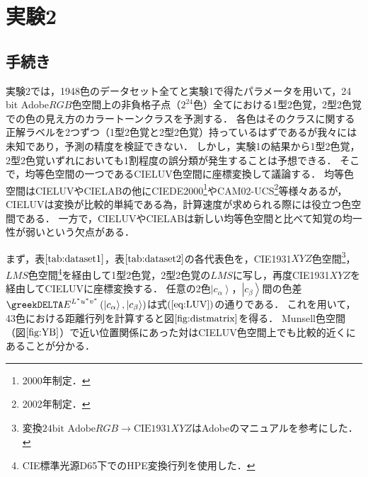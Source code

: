 \documentclass[uplatex,paper=a4,fontsize=4.0truemm,jafontsize=4.0truemm,head_space=30.0truemm,foot_space=30.0truemm,baselineskip=8.0truemm,line_length=40zw,gutter=25.0truemm,oneside,openany,fleqn,hanging_panctuation,open_bracket_pos=nibu_tentsuki,dvipdfmx,jis2004,book,titlepage]{jlreq}
\theoremstyle{mystyle}
\newcommand{\mathdisplaystyle}[1]{\(\displaystyle{#1}\)}
\newcommand{\Reference}[1]{\mathdisplaystyle{\ref{#1}}}
\newcommand{\Equationreference}[1]{\mathdisplaystyle{\parentheses{\ref{#1}}}}
\newcommand{\parentheses}[1]{\left(#1\right)}
\newcommand{\Diracket}[1]{\left\lvert#1\right\rangle}
\begin{document}
		\section{実験2}
			\subsection{手続き}
				実験2では，1948色のデータセット全てと実験1で得たパラメータを用いて，24 bit Adobe\mathdisplaystyle{RGB}色空間上の非負格子点（\mathdisplaystyle{2^{24}}色）全てにおける1型2色覚，2型2色覚での色の見え方のカラートーンクラスを予測する．
				各色はそのクラスに関する正解ラベルを2つずつ（1型2色覚と2型2色覚）持っているはずであるが我々には未知であり，予測の精度を検証できない．
				しかし，実験1の結果から1型2色覚，2型2色覚いずれにおいても1割程度の誤分類が発生することは予想できる．
				そこで，均等色空間の一つであるCIELUV色空間に座標変換して議論する．
				均等色空間はCIELUVやCIELABの他にCIEDE2000\footnote{2000年制定．}やCAM02-UCS\footnote{2002年制定．}等様々ある\cite{Yaguchi2017b}が，CIELUVは変換が比較的単純である為，計算速度が求められる際には役立つ色空間である．
				一方で，CIELUVやCIELABは新しい均等色空間と比べて知覚の均一性が弱いという欠点がある\cite[p.~10]{Robertson1977}．

				まず，表\Reference{tab:dataset1}，表\Reference{tab:dataset2}の各代表色を，CIE1931\mathdisplaystyle{XYZ}色空間\footnote{変換\mathdisplaystyle{\textrm{24bit Adobe}RGB\to\textrm{CIE1931}XYZ}はAdobe\textregistered のマニュアル\cite{Adobe2005}を参考にした．}，\mathdisplaystyle{LMS}色空間\footnote{CIE標準光源D65下でのHPE変換行列を使用した．}を経由して1型2色覚，2型2色覚の\mathdisplaystyle{LMS}に写し，再度CIE1931\mathdisplaystyle{XYZ}を経由してCIELUVに座標変換する．
				任意の2色\mathdisplaystyle{\Diracket{c_\alpha}}，\mathdisplaystyle{\Diracket{c_\beta}}間の色差\mathdisplaystyle{\greekDELTA E^{L^\ast u^\ast v^\ast}\parentheses{\Diracket{c_\alpha},\Diracket{c_\beta}}}は式\Equationreference{eq:LUV}の通りである．
				これを用いて，43色における距離行列を計算すると図\Reference{fig:distmatrix}を得る．
				Munsell色空間（図\Reference{fig:YB}）で近い位置関係にあった対はCIELUV色空間上でも比較的近くにあることが分かる．
\end{document}
